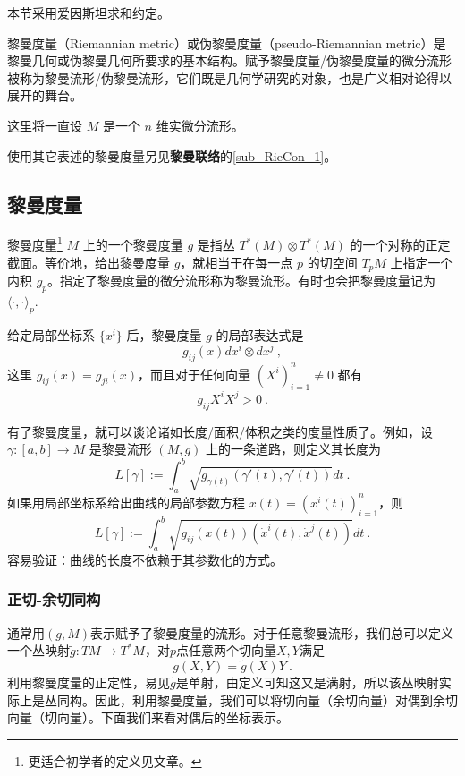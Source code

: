 
本节采用爱因斯坦求和约定。

黎曼度量（Riemannian metric）或伪黎曼度量（pseudo-Riemannian metric）是黎曼几何或伪黎曼几何所要求的基本结构。赋予黎曼度量/伪黎曼度量的微分流形被称为黎曼流形/伪黎曼流形，它们既是几何学研究的对象，也是广义相对论得以展开的舞台。

这里将一直设 $M$ 是一个 $n$ 维实微分流形。

使用其它表述的黎曼度量另见\textbf{黎曼联络}的\autoref{sub_RieCon_1}。

\subsection{黎曼度量}
\begin{definition}{黎曼度量\footnote{更适合初学者的定义见文章。}}
$M$ 上的一个黎曼度量 $g$ 是指丛 $T^*(M)\otimes T^*(M)$ 的一个对称的正定截面。等价地，给出黎曼度量 $g$，就相当于在每一点 $p$ 的切空间 $T_pM$ 上指定一个内积 $g_p$。指定了黎曼度量的微分流形称为黎曼流形。有时也会把黎曼度量记为 $\langle\cdot,\cdot\rangle_p$.
\end{definition}
给定局部坐标系 $\{x^i\}$ 后，黎曼度量 $g$ 的局部表达式是
$$
g_{ij}(x)dx^i\otimes dx^j~,
$$
这里 $g_{ij}(x)=g_{ji}(x)$，而且对于任何向量 $(X^i)_{i=1}^n\neq0$ 都有
$$
g_{ij}X^iX^j>0~.
$$

有了黎曼度量，就可以谈论诸如长度/面积/体积之类的度量性质了。例如，设 $\gamma:[a,b]\to M$ 是黎曼流形 $(M,g)$ 上的一条道路，则定义其长度为
$$
L[\gamma]:=\int_{a}^b \sqrt{g_{\gamma(t)}(\gamma'(t),\gamma'(t))}dt~.
$$
如果用局部坐标系给出曲线的局部参数方程 $x(t)=(x^i(t))_{i=1}^n$，则
$$
L[\gamma]:=\int_{a}^b \sqrt{g_{ij}(x(t))(\dot x^i(t),\dot x^j(t))}dt~.
$$
容易验证：曲线的长度不依赖于其参数化的方式。
\subsubsection{正切-余切同构}
通常用$(g,M)$表示赋予了黎曼度量的流形。对于任意黎曼流形，我们总可以定义一个丛映射$\widetilde g:TM\rightarrow T^*M$，对$p$点任意两个切向量$X,Y$满足
\begin{equation}
g(X,Y)=\widetilde g(X)Y~.
\end{equation}
利用黎曼度量的正定性，易见$\widetilde g$是单射，由定义可知这又是满射，所以该丛映射实际上是丛同构。因此，利用黎曼度量，我们可以将切向量（余切向量）对偶到余切向量（切向量）。下面我们来看对偶后的坐标表示。


